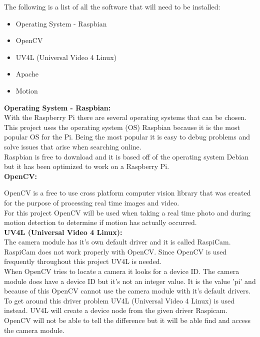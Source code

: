 \documentclass[12pt]{report}
\begin{document}
The following is a list of all the software that will need to be installed:\\
\begin{itemize}
  \item Operating System - Raspbian \\
  \item OpenCV\\
  \item UV4L (Universal Video 4 Linux)\\  
  \item Apache\\
  \item Motion\\
\end{itemize}

\noindent
{\bf Operating System - Raspbian:}\\
\break
With the Raspberry Pi there are several operating systems that can be chosen. This project uses the operating system (OS) Raspbian because it is the most popular OS for the Pi. Being the most popular it is easy to debug problems and solve issues that arise when searching online.\\

Raspbian is free to download and it is based off of the operating system Debian but it has been optimized to work on a Raspberry Pi. \\ 

\noindent
{\bf OpenCV:}\\
\break

OpenCV is a free to use cross platform computer vision library that was created for the purpose of processing real time images and video.\\

For this project OpenCV will be used when taking a real time photo and during motion detection to determine if motion has actually occurred.\\

\noindent
{\bf UV4L (Universal Video 4 Linux):}\\
\break
The camera module has it's own default driver and it is called RaspiCam. RaspiCam does not work properly with OpenCV. Since OpenCV is used frequently throughout this project UV4L is needed.\\

When OpenCV tries to locate a camera it looks for a device ID. The camera module does have a device ID but it's not an integer value. It is the value 'pi' and because of this OpenCV cannot use the camera module with it's default drivers. To get around this driver problem UV4L (Universal Video 4 Linux) is used instead. UV4L will create a device node from the given driver Raspicam. OpenCV will not be able to tell the difference but it will be able find and access the camera module.\\
\end{document}

